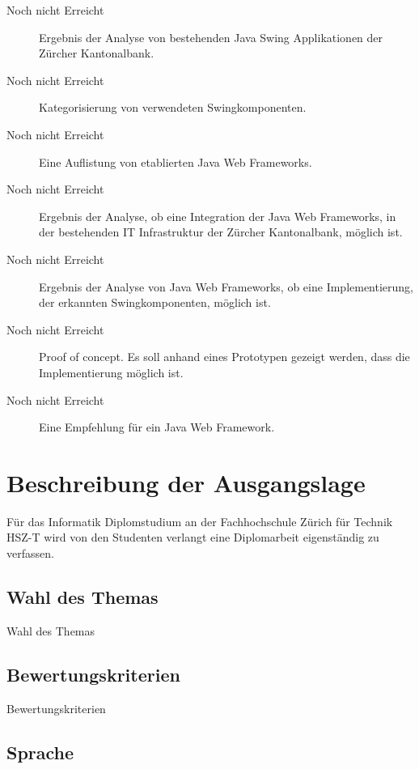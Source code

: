 \documentclass[abstracton, listof=totocnumbered,
bibliography=totocnumbered]{scrreprt}
\begin{document}
  \begin{description}
    \item [Noch nicht Erreicht] Ergebnis der Analyse von bestehenden Java Swing
    Applikationen der Zürcher Kantonalbank.
    \item [Noch nicht Erreicht] Kategorisierung von verwendeten
    Swingkomponenten.
    \item [Noch nicht Erreicht] Eine Auflistung von etablierten Java Web
    Frameworks.
    \item [Noch nicht Erreicht] Ergebnis der Analyse, ob eine Integration der
    Java Web Frameworks, in der bestehenden IT Infrastruktur der Zürcher
    Kantonalbank, möglich ist.
    \item [Noch nicht Erreicht] Ergebnis der Analyse von Java Web Frameworks, ob
    eine Implementierung, der erkannten Swingkomponenten, möglich ist.
    \item [Noch nicht Erreicht] Proof of concept. Es soll anhand eines
    Prototypen gezeigt werden, dass die Implementierung möglich ist.
    \item [Noch nicht Erreicht] Eine Empfehlung für ein Java Web Framework.
  \end{description}
  
  
  \chapter{Beschreibung der Ausgangslage}
  
  Für das Informatik Diplomstudium an der Fachhochschule Zürich für Technik
  HSZ-T wird von den Studenten verlangt eine Diplomarbeit eigenständig zu
  verfassen.
  
  \section{Wahl des Themas}
  
  Wahl des Themas
  
  \section{Bewertungskriterien}
  
  Bewertungskriterien 
  
  \section{Sprache}
  
\end{document}
